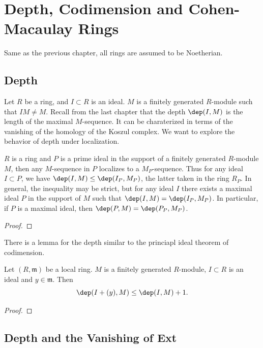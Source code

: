 \chapter{Depth, Codimension and Cohen-Macaulay Rings}
Same as the previous chapter, all rings are assumed to be Noetherian.
\section{Depth}

Let \(R\) be a ring, and \(I\subset R\) is an ideal. \(M\) is a finitely generated \(R\)-module such that \(IM\neq M\). Recall from the last chapter that the depth \(\dep(I,M)\) is the length of the maximal \(M\)-sequence. It can be charaterized in terms of the vanishing of the homology of the Koszul complex. We want to explore the behavior of depth under localization.

\begin{lemma}\label{deplocal}
    \(R\) is a ring and \(P\) is a prime ideal in the support of a finitely generated \(R\)-module \(M\), then any \(M\)-sequence in \(P\) localizes to a \(M_P\)-sequence. Thus for any ideal \(I\subset P\), we have \(\dep(I,M)\leq \dep (I_P,M_P)\), the latter taken in the ring \(R_P\). In general, the inequality may be strict, but for any ideal \(I\) there exists a maximal ideal \(P\) in the support of \(M\) such that \(\dep(I,M)=\dep(I_P,M_P)\). In particular, if \(P\) is a maximal ideal, then \(\dep(P,M)=\dep(P_P,M_P)\).
\end{lemma}

\begin{proof}
    
\end{proof}

There is a lemma for the depth similar to the princiapl ideal theorem of codimension.

\begin{lemma}\label{depprinc}
   Let \((R,\mathfrak{m})\) be a local ring. \(M\) is a finitely generated \(R\)-module, \(I\subset R\) is an ideal and \(y\in \mathfrak{m}\). Then 
   \[\dep(I+(y),M)\leq \dep (I,M)+1.\] 
\end{lemma}

\begin{proof}
    
\end{proof}

\section{Depth and the Vanishing of Ext}

